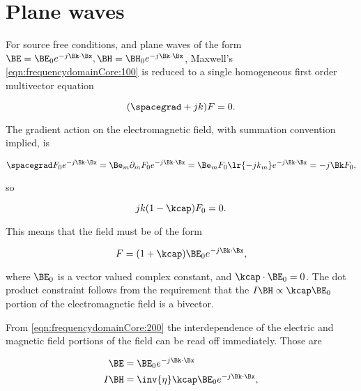 %
%
\section{Plane waves}

For source free conditions, and plane waves of the form \( \BE = \BE_0 e^{-j \Bk \cdot \Bx}, \BH = \BH_0 e^{-j \Bk \cdot \Bx} \), Maxwell's \cref{eqn:frequencydomainCore:100} is reduced to a single homogeneous first order multivector equation

\begin{dmath}\label{eqn:frequencydomainCore:140}
(\spacegrad + j k) F = 0.
\end{dmath}

The gradient action on the electromagnetic field, with summation convention implied, is

\begin{dmath}\label{eqn:frequencydomainCore:160}
\spacegrad F_0 e^{-j \Bk \cdot \Bx}
=
\Be_m \partial_m
F_0 e^{-j \Bk \cdot \Bx}
=
\Be_m
F_0
\lr{ -j k_m }
e^{-j \Bk \cdot \Bx}
=
-j \Bk F_0,
\end{dmath}

so

\begin{dmath}\label{eqn:frequencydomainCore:180}
j k (1 - \kcap) F_0 = 0.
\end{dmath}

This means that the field must be of the form

\begin{dmath}\label{eqn:frequencydomainCore:200}
F = (1 + \kcap) \BE_0 e^{-j \Bk \cdot \Bx},
\end{dmath}

where \( \BE_0 \) is a vector valued complex constant, and \( \kcap \cdot \BE_0 = 0 \).  The dot product constraint follows from the requirement that the \( I \BH \propto \kcap \BE_0 \) portion of the electromagnetic field is a bivector.

From \cref{eqn:frequencydomainCore:200} the interdependence of the electric and magnetic field portions of the field can be read off immediately.  Those are

\begin{dmath}\label{eqn:frequencydomainCore:220}
\begin{aligned}
\BE &= \BE_0 e^{-j \Bk \cdot \Bx} \\
I \BH &= \inv{\eta} \kcap \BE_0 e^{-j \Bk \cdot \Bx},
\end{aligned}
\end{dmath}

